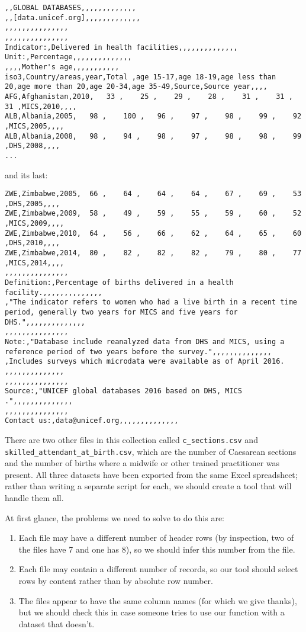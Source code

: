 \begin{lstlisting}
,,GLOBAL DATABASES,,,,,,,,,,,,,
,,[data.unicef.org],,,,,,,,,,,,,
,,,,,,,,,,,,,,,
,,,,,,,,,,,,,,,
Indicator:,Delivered in health facilities,,,,,,,,,,,,,,
Unit:,Percentage,,,,,,,,,,,,,,
,,,,Mother's age,,,,,,,,,,,
iso3,Country/areas,year,Total ,age 15-17,age 18-19,age less than 20,age more than 20,age 20-34,age 35-49,Source,Source year,,,,
AFG,Afghanistan,2010,   33 ,    25 ,    29 ,    28 ,    31 ,    31 ,    31 ,MICS,2010,,,,
ALB,Albania,2005,   98 ,    100 ,   96 ,    97 ,    98 ,    99 ,    92 ,MICS,2005,,,,
ALB,Albania,2008,   98 ,    94 ,    98 ,    97 ,    98 ,    98 ,    99 ,DHS,2008,,,,
...
\end{lstlisting}

and its last:

\begin{lstlisting}
ZWE,Zimbabwe,2005,  66 ,    64 ,    64 ,    64 ,    67 ,    69 ,    53 ,DHS,2005,,,,
ZWE,Zimbabwe,2009,  58 ,    49 ,    59 ,    55 ,    59 ,    60 ,    52 ,MICS,2009,,,,
ZWE,Zimbabwe,2010,  64 ,    56 ,    66 ,    62 ,    64 ,    65 ,    60 ,DHS,2010,,,,
ZWE,Zimbabwe,2014,  80 ,    82 ,    82 ,    82 ,    79 ,    80 ,    77 ,MICS,2014,,,,
,,,,,,,,,,,,,,,
Definition:,Percentage of births delivered in a health facility.,,,,,,,,,,,,,,
,"The indicator refers to women who had a live birth in a recent time period, generally two years for MICS and five years for DHS.",,,,,,,,,,,,,,
,,,,,,,,,,,,,,,
Note:,"Database include reanalyzed data from DHS and MICS, using a reference period of two years before the survey.",,,,,,,,,,,,,,
,Includes surveys which microdata were available as of April 2016. ,,,,,,,,,,,,,,
,,,,,,,,,,,,,,,
Source:,"UNICEF global databases 2016 based on DHS, MICS .",,,,,,,,,,,,,,
,,,,,,,,,,,,,,,
Contact us:,data@unicef.org,,,,,,,,,,,,,,
\end{lstlisting}

There are two other files in this collection called \texttt{c\_sections.csv} and \texttt{skilled\_attendant\_at\_birth.csv},
which are the number of Caesarean sections
and the number of births where a midwife or other trained practitioner was present.
All three datasets have been exported from the same Excel spreadsheet;
rather than writing a separate script for each,
we should create a tool that will handle them all.

At first glance,
the problems we need to solve to do this are:

\begin{enumerate}
\item
  Each file may have a different number of header rows
  (by inspection, two of the files have 7 and one has 8),
  so we should infer this number from the file.
\item
  Each file may contain a different number of records,
  so our tool should select rows by content rather than by absolute row number.
\item
  The files appear to have the same column names
  (for which we give thanks),
  but we should check this in case someone tries to use our function
  with a dataset that doesn't.
\end{enumerate}

